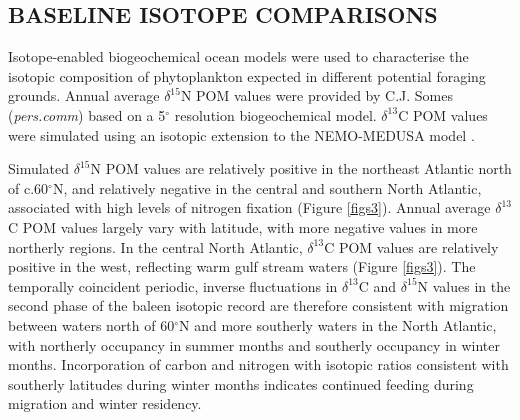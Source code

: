 \documentclass[a4paper,10pt]{article}
\begin{document}
\subsection*{BASELINE ISOTOPE COMPARISONS}
Isotope-enabled biogeochemical ocean models \citep{magozzi2017using,schmittner2016complementary} were used to characterise the isotopic composition of phytoplankton expected in different potential foraging grounds. 
Annual average $\delta^{15}$N POM values were provided by C.J. Somes (\textit{pers.comm}) based on a 5$^{\circ}$ resolution biogeochemical model. 
$\delta^{13}$C POM values were simulated using an isotopic extension to the NEMO-MEDUSA model \citep{magozzi2017using}.
 
Simulated $\delta^{15}$N POM values are relatively positive in the northeast Atlantic north of c.60$^{\circ}$N, and relatively negative in the central and southern North Atlantic, associated with high levels of nitrogen fixation (Figure \ref{figs3}). 
Annual average $\delta^{13}$C POM values largely vary with latitude, with more negative values in more northerly regions. 
In the central North Atlantic, $\delta^{13}$C POM values are relatively positive in the west, reflecting warm gulf stream waters (Figure \ref{figs3}). 
The temporally coincident periodic, inverse fluctuations in $\delta^{13}$C and $\delta^{15}$N values in the second phase of the baleen isotopic record are therefore consistent with migration between waters north of 60$^{\circ}$N and more southerly waters in the North Atlantic, with northerly occupancy in summer months and southerly occupancy in winter months. 
Incorporation of carbon and nitrogen with isotopic ratios consistent with southerly latitudes during winter months indicates continued feeding during migration and winter residency.
 
\end{document}
